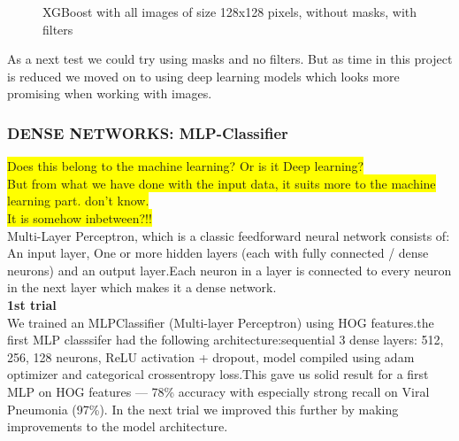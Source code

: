 \documentclass{article}
\begin{document}
\begin{figure}[!ht]
  \centering
  \qquad
  \caption{XGBoost with all images of size 128x128 pixels, without masks, with filters}
  \label{fig:XGBost_classifier_method_128_nomask_withfilter}
\end{figure}

As a next test we could try using masks and no filters. But as time in this project is reduced we moved on to using deep learning models which looks 
more promising when working with images. 

\subsubsection {DENSE NETWORKS: MLP-Classifier} 
\colorbox{yellow}{Does this belong to the machine learning? Or is it Deep learning?}\\
\colorbox{yellow}{But from what we have done with the input data, it suits more to the machine learning part. don't know.}\\
\colorbox{yellow}{It is somehow inbetween?!!}\\
 Multi-Layer Perceptron, which is a classic feedforward neural network consists of: An input layer, One or more hidden layers (each with fully connected / dense neurons) and an output layer.Each neuron in a layer is connected to every neuron in the next layer which makes it a dense network.\\
 
\textbf{1st trial }\\We trained an MLPClassifier (Multi-layer Perceptron) using HOG features.the first MLP classsifer had the following architecture:sequential 3 dense layers: 512, 256, 128 neurons, ReLU activation + dropout, model compiled using adam optimizer and categorical crossentropy loss.This gave us solid result for a first MLP on HOG features — 78\% accuracy with especially strong recall on Viral Pneumonia (97\%).
In the next trial we improved this further by making improvements to the model architecture.\\
\end{document}
